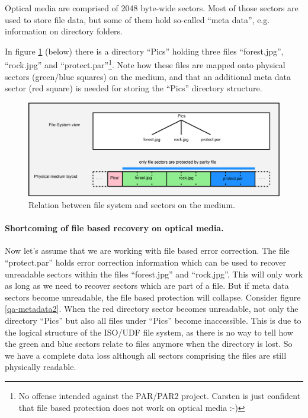     {\label{qa-image-level}Optical media are comprised of 2048 byte-wide sectors. Most of those
      sectors are used to store file data, but some of them hold
      so-called ``meta data'', e.g. information on directory folders.

      In figure \ref{qa-metadata1} (below) there is a directory ``Pics'' holding
      three files ``forest.jpg'', ``rock.jpg'' and ``protect.par''\footnote{No
        offense intended against the PAR/PAR2 project. Carsten is just confident
        that file based protection does not work on optical media :-)}.
      Note how these files are mapped onto physical sectors (green/blue
      squares) on the medium, and that an additional meta data sector
      (red square) is needed for storing the ``Pics'' directory structure.

\begin{figure}[h]
\centerline{\includegraphics[width=\textwidth]{figures/metadata1.pdf}}
\caption{Relation between file system and sectors on the medium.}  
\label{qa-metadata1}
\end{figure}

\paragraph{Shortcoming of file based recovery on optical media.} Now let's assume
that we are working with file based error correction. The file ``protect.par'' holds
error correction information which can be used to recover unreadable sectors within the
files ``forest.jpg'' and ``rock.jpg''. This will only work as long as we need to
recover sectors which are part of a file. But if meta data sectors become unreadable,
the file based protection will collapse. Consider figure \ref{qa-metadata2}.
When the red directory sector becomes unreadable, not only the
directory ``Pics'' but also all files under ``Pics'' become inaccessible.
This is due to the logical structure of the ISO/UDF file system, as there is
no way to tell how the green and blue sectors relate to files anymore when
the directory is lost. So we have a complete data loss although all sectors
comprising the files are still physically readable.

}
